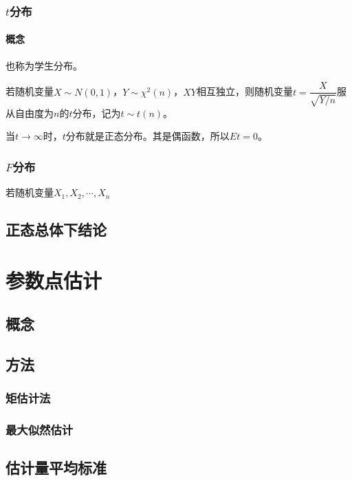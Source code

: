 \documentclass[UTF8, 12pt]{ctexart}
\begin{document}
\subsubsection{\texorpdfstring{$t$分布}{}}

\paragraph{概念} \leavevmode \medskip

也称为学生分布。

若随机变量$X\sim N(0,1)$，$Y\sim\chi^2(n)$，$XY$相互独立，则随机变量$t=\dfrac{X}{\sqrt{Y/n}}$服从自由度为$n$的$t$分布，记为$t\sim t(n)$。

当$t\to\infty$时，$t$分布就是正态分布。其是偶函数，所以$Et=0$。

\subsubsection{\texorpdfstring{$F$分布}{}}

若随机变量$X_1,X_2,\cdots,X_n$

\subsection{正态总体下结论}

\section{参数点估计}

\subsection{概念}

\subsection{方法}

\subsubsection{矩估计法}

\subsubsection{最大似然估计}

\subsection{估计量平均标准}
\end{document}
